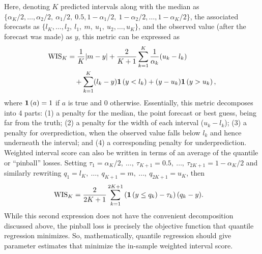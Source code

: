 \documentclass[9pt,twocolumn,twoside,lineno]{pnas-new}
\begin{document}
Here, denoting $K$ predicted intervals along with the median  as
$\{\alpha_K/2,\ldots,\alpha_2/2,\  
\alpha_1/2,\ 0.5, 1-\alpha_1/2,\ 1-\alpha_2/2,\ldots, 1-\alpha_K/2\}$, the associated
forecasts as $\{l_K,\ldots, l_2,\ l_1,\ m,\ u_1,\ u_2,\ldots, u_K \}$, and the observed
value (after the forecast was made) as $y$, this metric can be expressed as
\attn{someone please check this} 
\begin{align*}
 \operatorname{WIS}_K &= \frac{1}{K}|m -y | + \frac{2}{K+1}\sum_{k=1}^K 
\frac{1}{\alpha_k}(u_k - l_k)\\ &\quad + \sum_{k=1}^K  
(l_k - y)\mathbf{1}\left(y < l_k\right) +
(y - u_k)\mathbf{1}\left(y> u_k\right),
\end{align*}
where $\mathbf{1}\left(a\right) = 1$ if $a$ is true and $0$ otherwise. Essentially, this
metric decomposes into 4 parts: (1) a penalty for the median, the point forecast
or best guess, being far from the truth; (2) a penalty for the width of each
interval ($u_k - l_k$); (3)  a penalty for overprediction, when the observed
value falls below $l_k$ and hence underneath the interval; and (4) a
corresponding penalty for underprediction. Weighted interval score can also be
written in terms of an average of the quantile or ``pinball'' losses. Setting $\tau_1 =
\alpha_K/2,\ \ldots,\ \tau_{K+1} = 0.5,\ \ldots,\ \tau_{2K+1} = 1-\alpha_K/2$ and
similarly rewriting $q_1 = l_K,\ \ldots,\ q_{K+1}=m,\ \ldots,\ q_{2K+1}=u_K$, then
\begin{align*}
  \operatorname{WIS}_K &= \frac{2}{2K+1} \sum_{k=1}^{2K+1}
                         \left(\mathbf{1}\left(y \leq q_k\right) -\tau_k\right)
                         (q_k - y).
\end{align*}
While this second expression does not have the convenient decomposition
discussed above, the pinball loss is precisely the objective function that
quantile regression minimizes. So, mathematically, quantile regression should
give parameter estimates that minimize the in-sample weighted interval score.
\end{document}
